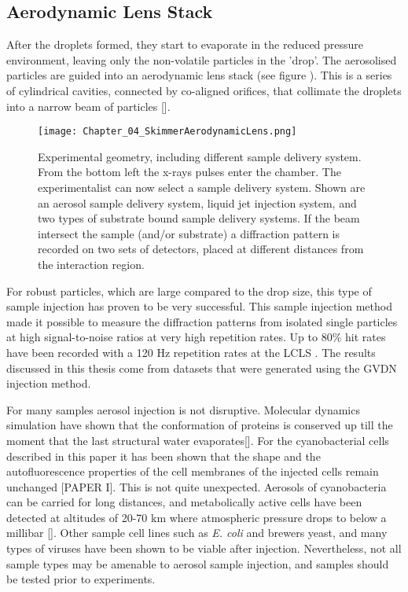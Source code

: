 \subsection{Aerodynamic Lens Stack}
After the droplets formed, they start to evaporate in the reduced pressure environment, leaving only the non-volatile particles in the 'drop'. The aerosolised particles are guided into an aerodynamic lens stack (see figure ). This is a series of cylindrical cavities, connected by co-aligned orifices, that collimate the droplets into a narrow beam of particles [].

\begin{figure}[h]\label{fig:skimmer_aerolens}
\centering 
\texttt{[image: Chapter\_04\_SkimmerAerodynamicLens.png]}
\caption{Experimental geometry, including different sample delivery system. From the bottom left the x-rays pulses enter the chamber. The experimentalist can now select a sample delivery system. Shown are an aerosol sample delivery system, liquid jet injection system, and two types of substrate bound sample delivery systems. If the beam intersect the sample (and/or substrate) a diffraction pattern is recorded on two sets of detectors, placed at different distances from the interaction region.}
\end{figure}

For robust particles, which are large compared to the drop size, this type of sample injection has proven to be very successful. This sample injection method made it possible to measure the diffraction patterns from isolated single particles at high signal-to-noise ratios at very high repetition rates. Up to 80\% hit rates have been recorded with a 120 Hz repetition rates at the LCLS \cite{Hantke2013}. The results discussed in this thesis come from datasets that were generated using the GVDN injection method.

For many samples aerosol injection is not disruptive. Molecular dynamics simulation have shown that the conformation of proteins is conserved up till the moment that the last structural water evaporates[]. For the cyanobacterial cells described in this paper it has been shown that the shape and the autofluorescence properties of the cell membranes of the injected cells remain unchanged [PAPER I]. This is not quite unexpected. Aerosols of cyanobacteria can be carried for long distances, and metabolically active cells have been detected at altitudes of 20-70 km where atmospheric pressure drops to below a millibar []. Other sample cell lines such as \textit{E. coli} and brewers yeast, and many types of viruses have been shown to be viable after injection. Nevertheless, not all sample types may be amenable to aerosol sample injection, and samples should be tested prior to experiments.  

